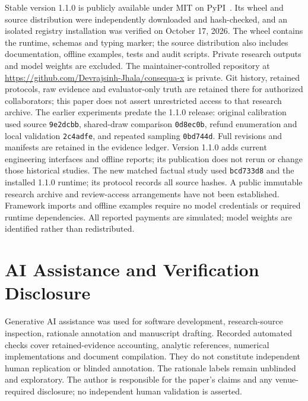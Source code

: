 \documentclass[conference]{IEEEtran}
\begin{document}
Stable version 1.1.0 is publicly available under MIT on PyPI~\cite{artifact}.
Its wheel and source distribution were independently downloaded and
hash-checked, and an isolated registry installation was verified on
October 17, 2026. The wheel contains the
runtime, schemas and typing marker; the source distribution also includes
documentation, offline examples, tests and audit scripts. Private research
outputs and model weights are excluded. The maintainer-controlled repository
at \url{https://github.com/Devrajsinh-Jhala/consequa-x} is private. Git history,
retained protocols, raw evidence and evaluator-only truth are retained there
for authorized collaborators; this paper does not assert unrestricted access
to that research archive.
The earlier experiments predate the 1.1.0 release: original calibration used source
\texttt{9e2dcbb}, shared-draw comparison \texttt{0d8ec0b}, refund enumeration
and local validation \texttt{2c4adfe}, and repeated sampling \texttt{0bd744d}.
Full revisions and manifests are retained in the evidence ledger. Version
1.1.0 adds current engineering interfaces and offline reports; its publication
does not rerun or change those historical studies. The new matched factual study used \texttt{bcd733d8} and the installed
1.1.0 runtime; its protocol records all source hashes. A public immutable
research archive and review-access arrangements have not been established.
Framework imports and offline examples require no model credentials or required
runtime dependencies. All reported payments are simulated; model weights are
identified rather than redistributed.

\section*{AI Assistance and Verification Disclosure}
Generative AI assistance was used for software development, research-source
inspection, rationale annotation and manuscript drafting. Recorded automated
checks cover retained-evidence accounting, analytic references, numerical
implementations and document compilation. They do not constitute independent
human replication or blinded annotation. The rationale labels remain unblinded
and exploratory. The author is responsible for the paper's claims and any
venue-required disclosure; no independent human validation is asserted.

\appendices
\end{document}
